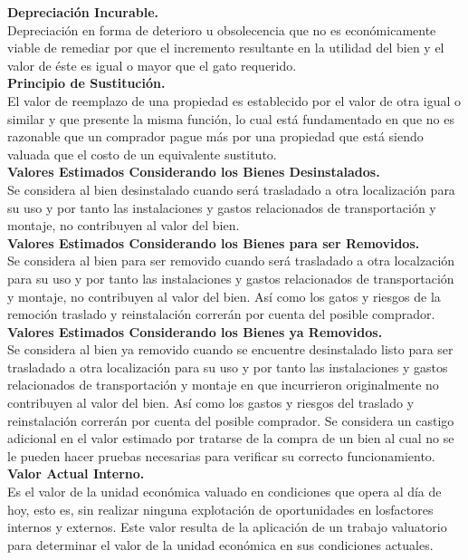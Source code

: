 \textbf{Depreciación Incurable.} \\ 
Depreciación en forma de deterioro u obsolecencia que no es económicamente viable de remediar por que el incremento resultante en la utilidad del bien y el valor de éste es igual o mayor que el gato requerido. \\[6mm] 
\textbf{Principio de Sustitución.} \\ 
El valor de reemplazo de una propiedad es establecido por el valor de otra igual o similar y que presente la misma función, lo cual está fundamentado en que no es razonable que un comprador pague más por una propiedad que está siendo valuada que el costo de un equivalente sustituto. \\[6mm] 
\textbf{Valores Estimados Considerando los Bienes Desinstalados.} \\ 
Se considera al bien desinstalado cuando será trasladado a otra localización para su uso y por tanto las instalaciones y gastos relacionados de transportación y montaje, no contribuyen al valor del bien. \\[6mm] 
\textbf{Valores Estimados Considerando los Bienes para ser Removidos.} \\ 
Se considera al bien para ser removido cuando será trasladado a otra localzación para su uso y por tanto las instalaciones y gastos relacionados de transportación y montaje, no contribuyen al valor del bien.
Así como los gatos y riesgos de la remoción traslado y reinstalación correrán por cuenta del posible comprador. \\[6mm] 
\textbf{Valores Estimados Considerando los Bienes ya Removidos.} \\ 
Se considera al bien ya removido cuando se encuentre desinstalado listo para ser trasladado a otra localización para su uso y por tanto las instalaciones y gastos relacionados de transportación y montaje en que incurrieron originalmente no contribuyen al valor del bien.
Así como los gastos y riesgos del traslado y reinstalación correrán por cuenta del posible comprador.
Se considera un castigo adicional en el valor estimado por tratarse de la compra de un bien al cual no se le pueden hacer pruebas necesarias para verificar su correcto funcionamiento. \\[6mm]
\textbf{Valor Actual Interno. } \\ 
Es el valor de la unidad económica valuado en condiciones que opera al día de hoy, esto es, sin realizar ninguna explotación de oportunidades en losfactores internos y externos. Este valor resulta de la aplicación de un trabajo valuatorio para determinar el valor de la unidad económica en sus condiciones actuales.
\espacio
